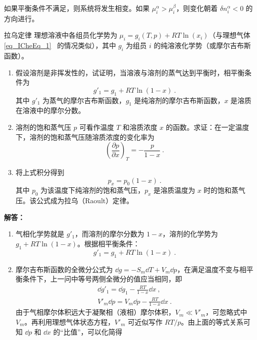 如果平衡条件不满足，则系统将发生相变。如果 $\mu_i^\alpha>\mu_i^\beta$，则变化朝着 $\delta n_i^\alpha<0$ 的方向进行。

\begin{example}{拉乌定律}
理想溶液中各组员化学势为 $\mu_i=g_i(T,p)+RT\ln(x_i)$（与理想气体 \autoref{eq_ICheEq_1}~ 的情况类似），其中 $g_i$ 为组员 $i$ 的纯溶液化学势（或摩尔吉布斯函数）。
\begin{enumerate}
\item 假设溶剂是非挥发性的，试证明，当溶液与溶剂的蒸气达到平衡时，相平衡条件为
\begin{equation}
g'_1=g_1+RT\ln(1-x)~.
\end{equation}
其中 $g'_1$ 为蒸气的摩尔吉布斯函数，$g_1$ 是纯溶剂的摩尔吉布斯函数，$x$ 是溶质在溶液中的摩尔分数。
\item 溶剂的饱和蒸气压 $p$ 可看作温度 $T$ 和溶质浓度 $x$ 的函数。求证：在一定温度下，溶剂的饱和蒸气压随溶质浓度的变化率为
\begin{equation}
\left(\frac{\partial p}{\partial x}\right)_T=-\frac{p}{1-x}~.
\end{equation}
\item 将上式积分得到
\begin{equation}
p_x=p_0(1-x)~.
\end{equation}
其中 $p_0$ 为该温度下纯溶剂的饱和蒸气压，$p_x$ 是溶质温度为 $x$ 时的饱和蒸气压。该公式成为拉乌（Raoult）定律。
\end{enumerate}
\textbf{解答：}
\begin{enumerate}
\item 气相化学势就是 $g'_1$，而溶剂的摩尔分数为 $1-x$，溶剂的化学势为$g_1+RT\ln(1-x)$。根据相平衡条件：
\begin{equation}
g'_1=g_1+RT\ln(1-x)~.
\end{equation}
\item 摩尔吉布斯函数的全微分公式为 $\dd g=-S_m\dd T+V_m\dd p$，在满足温度不变与相平衡条件下，上一问中等号两侧全微分的值应当相同，即
\begin{equation}
\begin{aligned}
\dd g'_1=\dd g_1-\frac{RT}{1-x}\dd x~,\\
V'_m\dd p=V_m\dd p-\frac{RT}{1-x}\dd x~.
\end{aligned}
\end{equation}
由于气相摩尔体积远大于凝聚相（液相）摩尔体积，$V_m\ll V'_m$，可忽略式中 $V_m$。再利用理想气体状态方程，$V'_m$ 可近似写作 $RT/p$。由上面的等式关系可知 $\dd p$ 和 $\dd x$ 的“比值”，可以化简得
\begin{equation}

\end{equation}
\end{enumerate}
\end{example}
